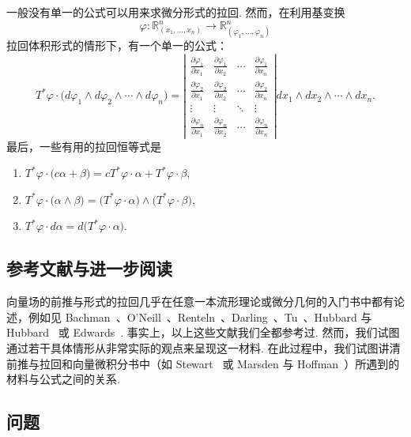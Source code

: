 一般没有单一的公式可以用来求微分形式的拉回. 然而，在利用基变换
\[
\varphi:\mathbb{R}^n_{(x_1,\ldots,x_n)}\longrightarrow\mathbb{R}^n_{(\varphi_1,\ldots,\varphi_n)}
\]
拉回体积形式的情形下，有一个单一的公式：
\[
T^*\varphi\cdot\bigl(d\varphi_1\wedge d\varphi_2\wedge\cdots\wedge d\varphi_n\bigr)
=\left|\begin{matrix}
\frac{\partial\varphi_1}{\partial x_1}&\frac{\partial\varphi_1}{\partial x_2}&\cdots&\frac{\partial\varphi_1}{\partial x_n}\\
\frac{\partial\varphi_2}{\partial x_1}&\frac{\partial\varphi_2}{\partial x_2}&\cdots&\frac{\partial\varphi_2}{\partial x_n}\\
\vdots&\vdots&\ddots&\vdots\\
\frac{\partial\varphi_n}{\partial x_1}&\frac{\partial\varphi_n}{\partial x_2}&\cdots&\frac{\partial\varphi_n}{\partial x_n}
\end{matrix}\right|dx_1\wedge dx_2\wedge\cdots\wedge dx_n.
\]
最后，一些有用的拉回恒等式是
\begin{enumerate}
  \item[(1)] $T^*\varphi\cdot\bigl(c\alpha+\beta\bigr)=cT^*\varphi\cdot\alpha+T^*\varphi\cdot\beta,$
  \item[(2)] $T^*\varphi\cdot\bigl(\alpha\wedge\beta\bigr)=\bigl(T^*\varphi\cdot\alpha\bigr)\wedge\bigl(T^*\varphi\cdot\beta\bigr),$
  \item[(3)] $T^*\varphi\cdot d\alpha=d\bigl(T^*\varphi\cdot\alpha\bigr).$
\end{enumerate}

\subsection{参考文献与进一步阅读}

向量场的前推与形式的拉回几乎在任意一本流形理论或微分几何的入门书中都有论述，例如见 Bachman~\cite{ref04}、O'Neill~\cite{ref36}、Renteln~\cite{ref37}、Darling~\cite{ref12}、Tu~\cite{ref46}、Hubbard 与 Hubbard~\cite{ref27} 或 Edwards~\cite{ref18}. 事实上，以上这些文献我们全都参考过. 然而，我们试图通过若干具体情形从非常实际的观点来呈现这一材料. 在此过程中，我们试图讲清前推与拉回和向量微积分书中（如 Stewart~\cite{ref43} 或 Marsden 与 Hoffman~\cite{ref31}）所遇到的材料与公式之间的关系.

\subsection{问题}


